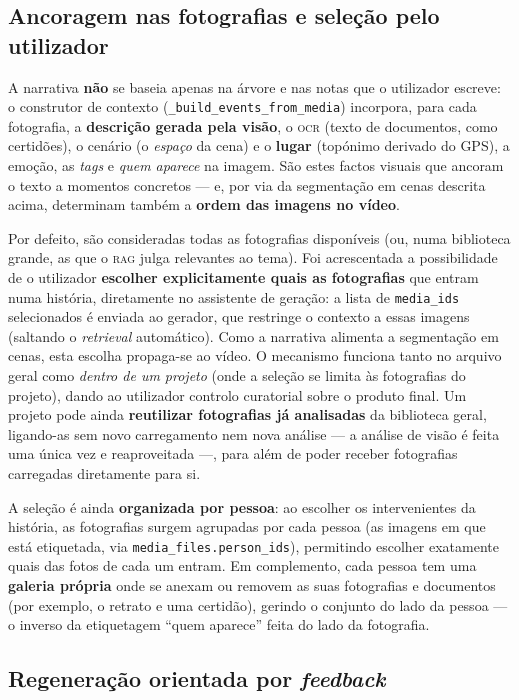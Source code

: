 \subsection{Ancoragem nas fotografias e seleção pelo utilizador}
\label{sub:selecao_fotos}

A narrativa \textbf{não} se baseia apenas na árvore e nas notas que o
utilizador escreve: o construtor de contexto (\texttt{\_build\_events\_from\_media})
incorpora, para cada fotografia, a \textbf{descrição gerada pela visão}, o
\textsc{ocr} (texto de documentos, como certidões), o cenário (o
\emph{espaço} da cena) e o \textbf{lugar} (topónimo derivado do GPS), a
emoção, as \emph{tags} e \emph{quem aparece} na imagem. São estes factos visuais que
ancoram o texto a momentos concretos --- e, por via da segmentação em cenas
descrita acima, determinam também a \textbf{ordem das imagens no vídeo}.

Por defeito, são consideradas todas as fotografias disponíveis (ou, numa
biblioteca grande, as que o \textsc{rag} julga relevantes ao tema). Foi
acrescentada a possibilidade de o utilizador \textbf{escolher explicitamente
quais as fotografias} que entram numa história, diretamente no assistente de
geração: a lista de \texttt{media\_ids} selecionados é enviada ao gerador,
que restringe o contexto a essas imagens (saltando o \emph{retrieval}
automático). Como a narrativa alimenta a segmentação em cenas, esta escolha
propaga-se ao vídeo. O mecanismo funciona tanto no arquivo geral como
\emph{dentro de um projeto} (onde a seleção se limita às fotografias do
projeto), dando ao utilizador controlo curatorial sobre o produto final. Um
projeto pode ainda \textbf{reutilizar fotografias já analisadas} da
biblioteca geral, ligando-as sem novo carregamento nem nova análise --- a
análise de visão é feita uma única vez e reaproveitada ---, para além de
poder receber fotografias carregadas diretamente para si.

A seleção é ainda \textbf{organizada por pessoa}: ao escolher os
intervenientes da história, as fotografias surgem agrupadas por cada pessoa
(as imagens em que está etiquetada, via \texttt{media\_files.person\_ids}),
permitindo escolher exatamente quais das fotos de cada um entram. Em
complemento, cada pessoa tem uma \textbf{galeria própria} onde se anexam ou
removem as suas fotografias e documentos (por exemplo, o retrato e uma
certidão), gerindo o conjunto do lado da pessoa --- o inverso da etiquetagem
``quem aparece'' feita do lado da fotografia.

\subsection{Regeneração orientada por \emph{feedback}}
\label{sub:regenerar}

